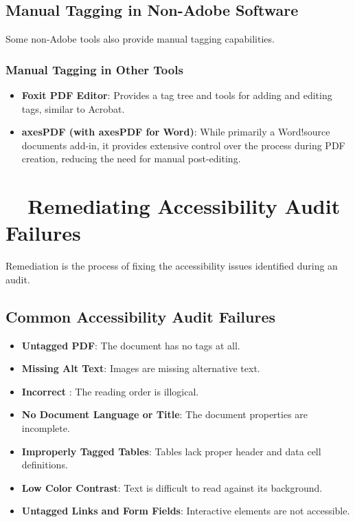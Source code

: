 \subsection{Manual Tagging in Non-Adobe Software}
\label{subsec:manual-tagging-non-adobe}
Some non-Adobe tools also provide manual tagging capabilities.

\subsubsection{Manual Tagging in Other Tools}
\label{ssubsec:manual-tagging-other-tools}
\begin{itemize}
	\item \textbf{Foxit PDF Editor}: Provides a tag tree and tools for adding and editing tags, similar to Acrobat.
	\item \textbf{axesPDF (with axesPDF for Word)}: While primarily a Word!source documents add-in, it provides extensive control over the process during PDF creation, reducing the need for manual post-editing.
\end{itemize}

\section{~~Remediating Accessibility Audit Failures}
\label{sec:remediating-audit-failures}
Remediation is the process of fixing the accessibility issues identified during an audit.

\subsection{Common Accessibility Audit Failures}
\label{subsec:common-audit-failures}
\begin{itemize}
	\item \textbf{Untagged PDF}: The document has no tags at all.
	\item \textbf{Missing Alt Text}: Images are missing alternative text.
	\item \textbf{Incorrect }: The reading order is illogical.
	\item \textbf{No Document Language or Title}: The document properties are incomplete.
	\item \textbf{Improperly Tagged Tables}: Tables lack proper header and data cell definitions.
	\item \textbf{Low Color Contrast}: Text is difficult to read against its background.
	\item \textbf{Untagged Links and Form Fields}: Interactive elements are not accessible.
\end{itemize}


